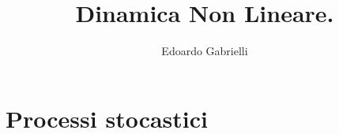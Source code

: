 
\author{Edoardo Gabrielli}
\title{Dinamica Non Lineare.}


\mygeo
\maketitle 
\tableofcontents


\part{Processi stocastici}
\restoregeometry





